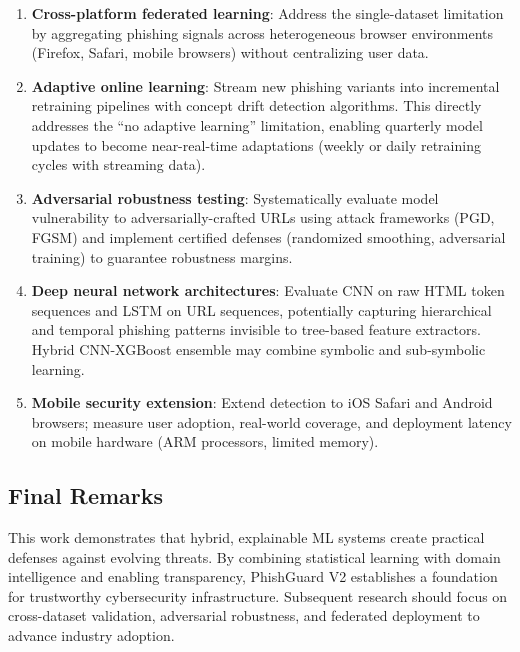 \documentclass[conference]{IEEEtran}
\begin{document}
\begin{enumerate}
\item \textbf{Cross-platform federated learning}: Address the single-dataset limitation by aggregating phishing signals across heterogeneous browser environments (Firefox, Safari, mobile browsers) without centralizing user data.

\item \textbf{Adaptive online learning}: Stream new phishing variants into incremental retraining pipelines with concept drift detection algorithms. This directly addresses the ``no adaptive learning'' limitation, enabling quarterly model updates to become near-real-time adaptations (weekly or daily retraining cycles with streaming data).

\item \textbf{Adversarial robustness testing}: Systematically evaluate model vulnerability to adversarially-crafted URLs using attack frameworks (PGD, FGSM) and implement certified defenses (randomized smoothing, adversarial training) to guarantee robustness margins.

\item \textbf{Deep neural network architectures}: Evaluate CNN on raw HTML token sequences and LSTM on URL sequences, potentially capturing hierarchical and temporal phishing patterns invisible to tree-based feature extractors. Hybrid CNN-XGBoost ensemble may combine symbolic and sub-symbolic learning.

\item \textbf{Mobile security extension}: Extend detection to iOS Safari and Android browsers; measure user adoption, real-world coverage, and deployment latency on mobile hardware (ARM processors, limited memory).
\end{enumerate}

\subsection{Final Remarks}

This work demonstrates that hybrid, explainable ML systems create practical defenses against evolving threats. By combining statistical learning with domain intelligence and enabling transparency, PhishGuard V2 establishes a foundation for trustworthy cybersecurity infrastructure. Subsequent research should focus on cross-dataset validation, adversarial robustness, and federated deployment to advance industry adoption.
\end{document}
